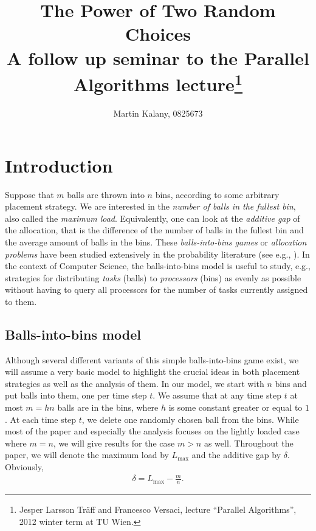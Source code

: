 \documentclass[a4paper,12pt]{article}
\newcommand\load{L_{\mathrm{max}}}
\begin{document}
\title{The Power of Two Random Choices\\ 
\large A follow up seminar to the Parallel Algorithms lecture\footnote{Jesper Larsson Tr\"aff and Francesco Versaci, lecture ``Parallel Algorithms'', 2012 winter term at TU Wien.}}
\author{Martin Kalany, 0825673}

\maketitle
\begin{abstract}

\end{abstract}

\section{Introduction}
\label{sec:intro}
Suppose that $m$ balls are thrown into $n$ bins, according to some arbitrary placement strategy. We are interested in the \emph{number of balls in the fullest bin}, also called the \emph{maximum load}. Equivalently, one can look at the \emph{additive gap} of the allocation, that is the difference of the number of balls in the fullest bin and the average amount of balls in the bins. These \emph{balls-into-bins games} or \emph{allocation problems} have been studied extensively in the probability literature (see e.g., \cite{JK77}). In the context of Computer Science, the balls-into-bins model is useful to study, e.g., strategies for distributing \emph{tasks} (balls) to \emph{processors} (bins) as evenly as possible without having to query all processors for the number of tasks currently assigned to them.

\subsection{Balls-into-bins model}
\label{sec:model}
Although several different variants of this simple balls-into-bins game exist, we will assume a very basic model to highlight the crucial ideas in both placement strategies as well as the analysis of them. In our model, we start with $n$ bins and put balls into them, one per time step $t$. We assume that at any time step $t$ at most $m = h n$ balls are in the bins, where $h$ is some constant greater or equal to $1$. At each time step $t$, we delete one randomly chosen ball from the bins. While most of the paper and especially the analysis focuses on the lightly loaded case where $m=n$, we will give results for the case $m > n$ as well. Throughout the paper, we will denote the maximum load by $\load$ and the additive gap by $\delta$. Obviously, 
\begin{align*}
\delta = \load - \frac{m}{n}.
\end{align*}
\end{document}
